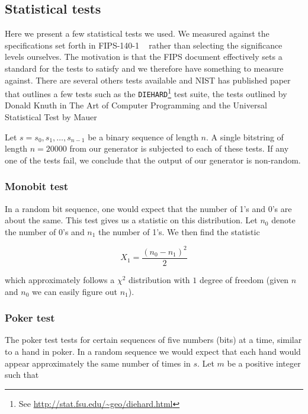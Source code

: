 \documentclass[a4paper]{article}           %
\begin{document}
\subsection{Statistical tests}
\label{sec:stattests}

 Here we present a few statistical tests we used. We measured against the specifications set forth in FIPS-140-1 ~\cite{fips140, menezes1996} rather than selecting the significance levels ourselves. The motivation is that the FIPS document effectively sets a standard for the tests to satisfy and we therefore have something to measure against. There are several others tests available and NIST has published paper ~\cite{nist} that outlines a few tests such as the \texttt{DIEHARD}\footnote{See \url{http://stat.fsu.edu/~geo/diehard.html}} test suite, the tests outlined by Donald Knuth in The Art of Computer Programming and the Universal Statistical Test by Mauer ~\cite{mauer}

Let $s = s_0, s_1, \ldots, s_{n-1}$ be a binary sequence of length $n$. A single bitstring of length $n = 20000$ from our generator is subjected to each of these tests. If any one of the tests fail, we conclude that the output of our generator is non-random. 

\subsubsection{Monobit test}

In a random bit sequence, one would expect that the number of 1's and 0's are about the same. This test gives us a statistic on this distribution. Let $n_0$ denote the number of 0's and $n_1$ the number of 1's. We then find the statistic

\begin{equation}
X_1 = \frac{(n_0 - n_1)^2}{2}
\end{equation}

which approximately follows a $\chi^2$ distribution with $1$ degree of freedom (given $n$ and $n_0$ we can easily figure out $n_1$). 

\subsubsection{Poker test}

The poker test tests for certain sequences of five numbers (bits) at a time, similar to a hand in poker. In a random sequence we would expect that each hand would appear approximately the same number of times in $s$. Let $m$ be a positive integer such that 
\end{document}
